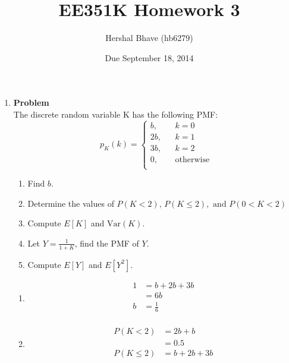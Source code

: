 \documentclass[12pt]{article}
\title{EE351K Homework 3}
\author{Hershal Bhave (hb6279)}
\date{Due September 18, 2014}
\newenvironment{Ex}{\textbf{Problem}\vspace{.75em}\\}{}
\begin{document}
\maketitle
\begin{enumerate}
\item
  \begin{Ex}
    The discrete random variable K has the following PMF:
    \begin{equation*}
      p_K(k) = \left\{
        \begin{aligned}
          b, && k=0 \\
          2b, && k=1 \\
          3b, && k=2 \\
          0, && \text{otherwise} \\
        \end{aligned}
      \end{equation*}
      \begin{enumerate}
      \item Find $b$.
      \item Determine the values of $P(K<2) \text{, } P(K \le 2),
        \text{ and } P(0<K<2)$
      \item Compute $E[K]$ and $\text{Var}(K)$.
      \item Let $Y = \frac{1}{1+K}$, find the PMF of $Y$.
      \item Compute $E[Y]$ and $E[Y^2]$.
      \end{enumerate}
      \begin{solution} \hfill
        \begin{enumerate}
        \item 
          \begin{equation}
            \label{eq:1a-sol}
            \begin{aligned}
              1 &= b + 2b + 3b \\
              &= 6b \\
              b &= \frac{1}{6} \\
            \end{aligned}
          \end{equation}
        \item
          \begin{equation}
            \label{eq:1b-k-lt-2-sol}
            \begin{aligned}
              P(K<2) &= 2b + b \\
              &= 0.5 \\
              P(K\le2) &= b + 2b + 3b \\

\end{aligned}
\end{equation}
\end{enumerate}
\end{solution}
\end{Ex}
\end{enumerate}
\end{document}
